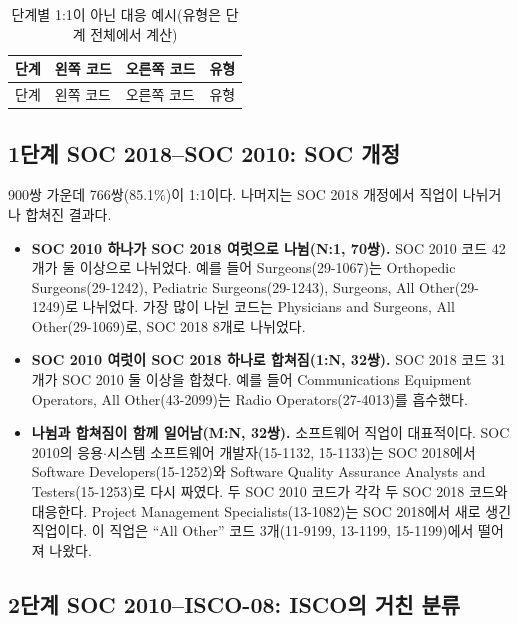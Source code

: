 \documentclass[11pt]{article}
\begin{document}
\begin{longtable}{R{0.8cm}L{6.2cm}L{6.8cm}L{1.2cm}}
\caption{단계별 1:1이 아닌 대응 예시(유형은 단계 전체에서 계산)}\label{tab:examples}\\
\toprule
단계 & 왼쪽 코드 & 오른쪽 코드 & 유형 \\
\midrule
\endfirsthead
\toprule
단계 & 왼쪽 코드 & 오른쪽 코드 & 유형 \\
\midrule
\endhead

\bottomrule
\end{longtable}

\subsection{1단계 SOC 2018–SOC 2010: SOC 개정}

900쌍 가운데 766쌍(85.1\%)이 1:1이다. 나머지는 SOC 2018 개정에서 직업이 나뉘거나 합쳐진 결과다.
\begin{itemize}[leftmargin=*]
  \item \textbf{SOC 2010 하나가 SOC 2018 여럿으로 나뉨(N:1, 70쌍).} SOC 2010 코드 42개가 둘 이상으로 나뉘었다. 예를 들어 Surgeons(29-1067)는 Orthopedic Surgeons(29-1242), Pediatric Surgeons(29-1243), Surgeons, All Other(29-1249)로 나뉘었다. 가장 많이 나뉜 코드는 Physicians and Surgeons, All Other(29-1069)로, SOC 2018 8개로 나뉘었다.
  \item \textbf{SOC 2010 여럿이 SOC 2018 하나로 합쳐짐(1:N, 32쌍).} SOC 2018 코드 31개가 SOC 2010 둘 이상을 합쳤다. 예를 들어 Communications Equipment Operators, All Other(43-2099)는 Radio Operators(27-4013)를 흡수했다.
  \item \textbf{나뉨과 합쳐짐이 함께 일어남(M:N, 32쌍).} 소프트웨어 직업이 대표적이다. SOC 2010의 응용$\cdot$시스템 소프트웨어 개발자(15-1132, 15-1133)는 SOC 2018에서 Software Developers(15-1252)와 Software Quality Assurance Analysts and Testers(15-1253)로 다시 짜였다. 두 SOC 2010 코드가 각각 두 SOC 2018 코드와 대응한다. Project Management Specialists(13-1082)는 SOC 2018에서 새로 생긴 직업이다. 이 직업은 ``All Other'' 코드 3개(11-9199, 13-1199, 15-1199)에서 떨어져 나왔다.
\end{itemize}

\subsection{2단계 SOC 2010–ISCO-08: ISCO의 거친 분류}
\end{document}

